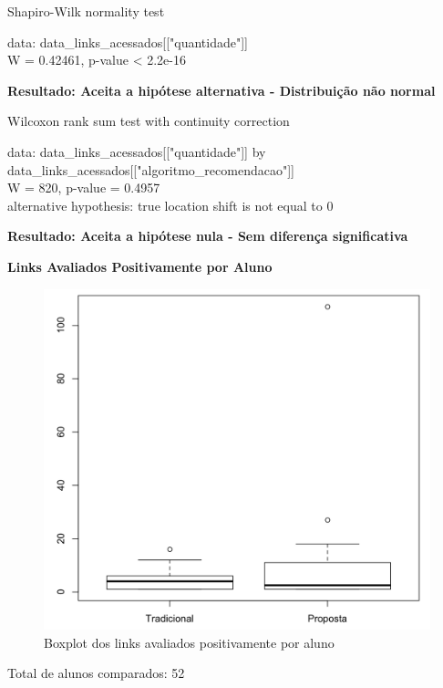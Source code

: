 Shapiro-Wilk normality test

\noindent
data:  data\_links\_acessados[["quantidade"]]\\
W = 0.42461, p-value < 2.2e-16

\textbf{Resultado: Aceita a hipótese alternativa - Distribuição não normal}

Wilcoxon rank sum test with continuity correction

\noindent
data:  data\_links\_acessados[["quantidade"]] by \\
data\_links\_acessados[["algoritmo\_recomendacao"]]\\
W = 820, p-value = 0.4957\\
alternative hypothesis: true location shift is not equal to 0

\textbf{Resultado: Aceita a hipótese nula - Sem diferença significativa}

\textbf{Links Avaliados Positivamente por Aluno}

\begin{figure}[htb]
  \caption{\label{fig:avaliados-positivamente-boxplot}Boxplot dos links avaliados positivamente por aluno}
  \begin{center}
      \includegraphics[scale=0.4]{./Figuras/avaliados-positivamente-boxplot.png}
  \end{center}
\end{figure}

Total de alunos comparados: 52

